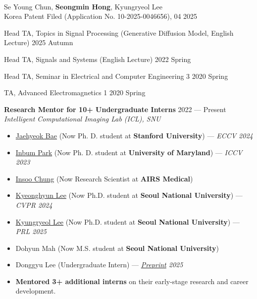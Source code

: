 \begin{cvcontent}
\\Se Young Chun, \textbf{Seongmin Hong}, Kyungryeol Lee\\
Korea Patent Filed (Application No. 10-2025-0046656), 04 2025

\end{cvcontent}
\begin{cvcontent}
Head TA, Topics in Signal Processing (Generative Diffusion Model, English Lecture) \hfill 2025 Autumn

Head TA, Signals and Systems (English Lecture) \hfill 2022 Spring

Head TA, Seminar in Electrical and Computer Engineering 3 \hfill 2020 Spring

TA, Advanced Electromagnetics 1 \hfill 2020 Spring
\end{cvcontent}

\begin{cvcontent}
\textbf{Research Mentor for 10+ Undergraduate Interns} \hfill 2022 --- Present \\
\textit{Intelligent Computational Imaging Lab (ICL), SNU}

\begin{itemize}[leftmargin=1.5em, itemsep=0.3ex]
    \item \href{https://jaehyeokbae.me/}{Jaehyeok Bae} (Now Ph. D. student at \textbf{Stanford University}) --- \textit{ECCV 2024}
    \item \href{https://inbumpark.github.io/}{Inbum Park} (Now Ph. D. student at \textbf{University of Maryland}) --- \textit{ICCV 2023}
    \item \href{https://www.linkedin.com/in/insoo-chung-07a242358/}{Insoo Chung} (Now Research Scientist at \textbf{AIRS Medical})
    \item \href{https://scholar.google.com/citations?user=guC7J3YAAAAJ&hl=ko}{Kyeonghyun Lee} (Now Ph.D. student at \textbf{Seoul National University}) --- \textit{CVPR 2024}
    \item \href{https://scholar.google.com/citations?user=Xei6FKcAAAAJ&hl=ko}{Kyungryeol Lee} (Now Ph.D. student at \textbf{Seoul National University}) --- \textit{PRL 2025}
    \item Dohyun Mah (Now M.S. student at \textbf{Seoul National University})
    \item Donggyu Lee (Undergraduate Intern) --- \textit{\href{https://dx.doi.org/10.2139/ssrn.5397023}{Preprint} 2025}
    \item \textbf{Mentored 3+ additional interns} on their early-stage research and career development.
\end{itemize}
\end{cvcontent}

